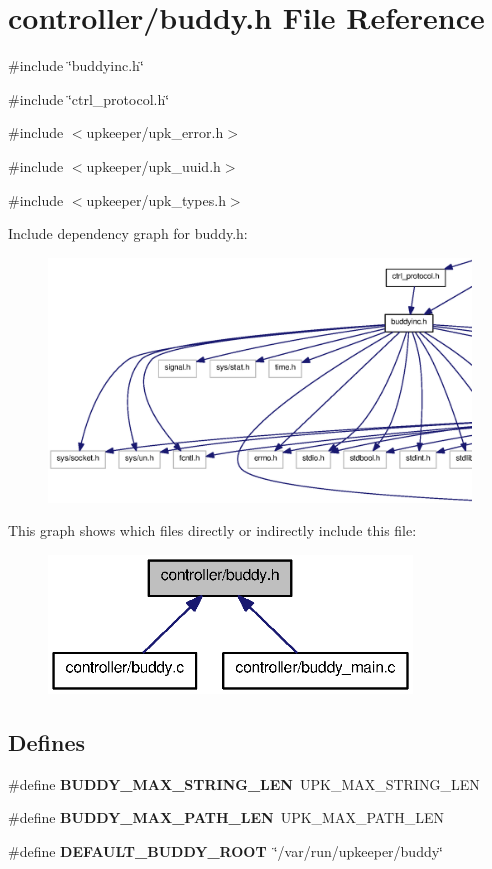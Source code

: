 \section{controller/buddy.h File Reference}
\label{buddy_8h}
{\ttfamily \#include \char`\"{}buddyinc.h\char`\"{}}\par
{\ttfamily \#include \char`\"{}ctrl\_\-protocol.h\char`\"{}}\par
{\ttfamily \#include $<$upkeeper/upk\_\-error.h$>$}\par
{\ttfamily \#include $<$upkeeper/upk\_\-uuid.h$>$}\par
{\ttfamily \#include $<$upkeeper/upk\_\-types.h$>$}\par
Include dependency graph for buddy.h:\nopagebreak
\begin{figure}[H]
\begin{center}
\leavevmode
\includegraphics[width=400pt]{buddy_8h__incl}
\end{center}
\end{figure}
This graph shows which files directly or indirectly include this file:\nopagebreak
\begin{figure}[H]
\begin{center}
\leavevmode
\includegraphics[width=274pt]{buddy_8h__dep__incl}
\end{center}
\end{figure}
\subsection*{Defines}
\begin{DoxyCompactItemize}
\item 
\#define {\bf BUDDY\_\-MAX\_\-STRING\_\-LEN}~UPK\_\-MAX\_\-STRING\_\-LEN
\item 
\#define {\bf BUDDY\_\-MAX\_\-PATH\_\-LEN}~UPK\_\-MAX\_\-PATH\_\-LEN
\item 
\#define {\bf DEFAULT\_\-BUDDY\_\-ROOT}~\char`\"{}/var/run/upkeeper/buddy\char`\"{}
\end{DoxyCompactItemize}

